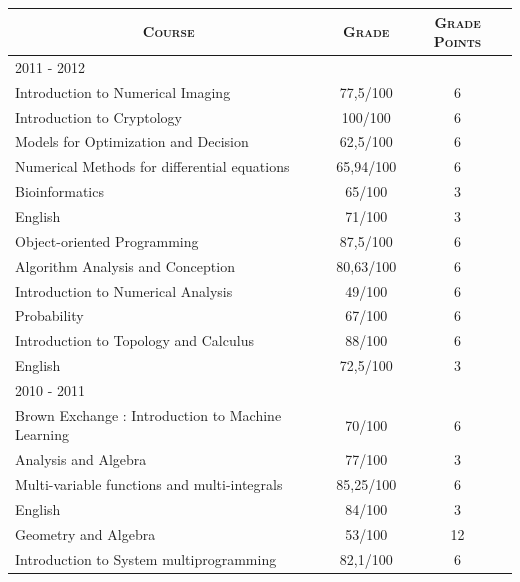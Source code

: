 \begin{center}
\begin{tabular}{lcc}
\multicolumn{1}{c}{\textsc{Course}} & \textsc{Grade} & \textsc{Grade Points}\\
\hline
\textsc{2011 - 2012} & & \\
\hline
Introduction to Numerical Imaging                          &  77,5/100 & 6     \\
Introduction to Cryptology                                 &   100/100 & 6     \\
Models for Optimization and Decision                       &  62,5/100 & 6     \\
Numerical Methods for differential equations               & 65,94/100 & 6     \\
Bioinformatics                                             &    65/100 & 3     \\
English                                                    &    71/100 & 3     \\
\hline
Object-oriented Programming                                &  87,5/100 & 6     \\
Algorithm Analysis and Conception                          & 80,63/100 & 6     \\
Introduction to Numerical Analysis                         &    49/100 & 6     \\
Probability                                                &    67/100 & 6     \\
Introduction to Topology and Calculus                      &    88/100 & 6     \\
English                                                    &  72,5/100 & 3     \\
\hline
\textsc{2010 - 2011} & & \\
\hline
Brown Exchange : Introduction to Machine Learning          &    70/100 & 6     \\
Analysis and Algebra                                       &    77/100 & 3     \\
Multi-variable functions and multi-integrals               & 85,25/100 & 6     \\
English                                                    &    84/100 & 3     \\
\hline
Geometry and Algebra                                       &    53/100 & 12    \\
Introduction to System multiprogramming                    &  82,1/100 & 6     \\

\end{tabular}
\end{center}
